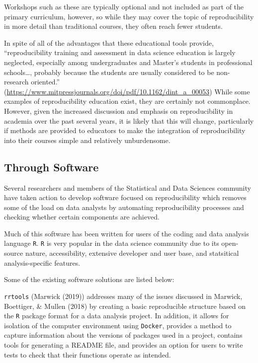 \documentclass[12pt,twoside]{reedthesis}
\begin{document}
Workshops such as these are typically optional and not included as part
of the primary curriculum, however, so while they may cover the topic of
reproducibility in more detail than traditional courses, they often
reach fewer students.

In spite of all of the advantages that these educational tools provide,
``reproducibility training and assessment in data science education is
largely neglected, especially among undergraduates and Master's students
in professional schools\ldots{}, probably because the students are
usually considered to be non-research oriented.''
(\url{https://www.mitpressjournals.org/doi/pdf/10.1162/dint_a_00053})
While some examples of reproducibility education exist, they are
certainly not commonplace. However, given the increased discussion and
emphasis on reproducibility in academia over the past several years, it
is likely that this will change, particularly if methods are provided to
educators to make the integration of reproducibility into their courses
simple and relatively unburdensome.

\subsection{Through Software}\label{through-software}

Several researchers and members of the Statistical and Data Sciences
community have taken action to develop software focused on
reproducibility which removes some of the load on data analysts by
automating reproducibility processes and checking whether certain
components are achieved.

Much of this software has been written for users of the coding and data
analysis language \texttt{R}. \texttt{R} is very popular in the data
science community due to its open-source nature, accessibility,
extensive developer and user base, and statsitical analysis-specific
features.

Some of the existing software solutions are listed below:

\texttt{rrtools} (Marwick (2019)) addresses many of the issues discussed
in Marwick, Boettiger, \& Mullen (2018) by creating a basic reproducible
structure based on the \texttt{R} package format for a data analysis
project. In addition, it allows for isolation of the computer
environment using \texttt{Docker}, provides a method to capture
information about the versions of packages used in a project, contains
tools for generating a README file, and provides an option for users to
write tests to check that their functions operate as intended.
\end{document}
